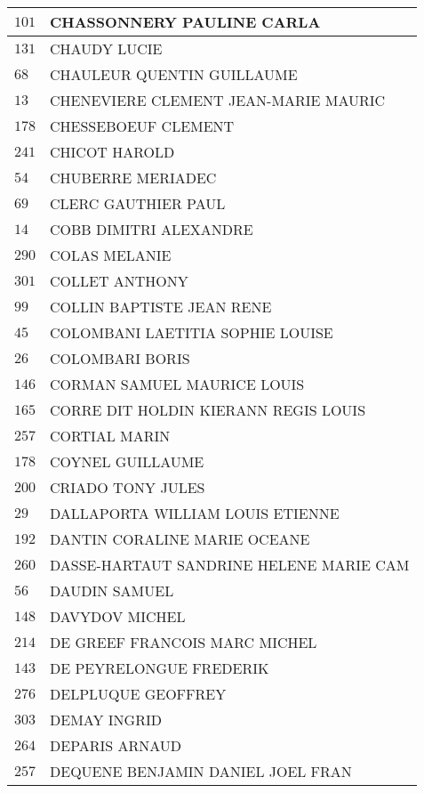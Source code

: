 \begin{xltabular}{\linewidth}{|l|X|}
    \hline
    $101$ & CHASSONNERY PAULINE CARLA \\
    \hline
    $131$ & CHAUDY LUCIE \\
    \hline
    $68$ & CHAULEUR QUENTIN GUILLAUME \\
    \hline
    $13$ & CHENEVIERE CLEMENT JEAN-MARIE MAURIC \\
    \hline
    $178$ & CHESSEBOEUF CLEMENT \\
    \hline
    $241$ & CHICOT HAROLD \\
    \hline
    $54$ & CHUBERRE MERIADEC \\
    \hline
    $69$ & CLERC GAUTHIER PAUL \\
    \hline
    $14$ & COBB DIMITRI ALEXANDRE \\
    \hline
    $290$ & COLAS MELANIE \\
    \hline
    $301$ & COLLET ANTHONY \\
    \hline
    $99$ & COLLIN BAPTISTE JEAN RENE \\
    \hline
    $45$ & COLOMBANI LAETITIA SOPHIE LOUISE \\
    \hline
    $26$ & COLOMBARI BORIS \\
    \hline
    $146$ & CORMAN SAMUEL MAURICE LOUIS \\
    \hline
    $165$ & CORRE DIT HOLDIN KIERANN REGIS LOUIS \\
    \hline
    $257$ & CORTIAL MARIN \\
    \hline
    $178$ & COYNEL GUILLAUME \\
    \hline
    $200$ & CRIADO TONY JULES \\
    \hline
    $29$ & DALLAPORTA WILLIAM LOUIS ETIENNE \\
    \hline
    $192$ & DANTIN CORALINE MARIE OCEANE \\
    \hline
    $260$ & DASSE-HARTAUT SANDRINE HELENE MARIE CAM \\
    \hline
    $56$ & DAUDIN SAMUEL \\
    \hline
    $148$ & DAVYDOV MICHEL \\
    \hline
    $214$ & DE GREEF FRANCOIS MARC MICHEL \\
    \hline
    $143$ & DE PEYRELONGUE FREDERIK \\
    \hline
    $276$ & DELPLUQUE GEOFFREY \\
    \hline
    $303$ & DEMAY INGRID \\
    \hline
    $264$ & DEPARIS ARNAUD \\
    \hline
    $257$ & DEQUENE BENJAMIN DANIEL JOEL FRAN \\

\end{xltabular}
